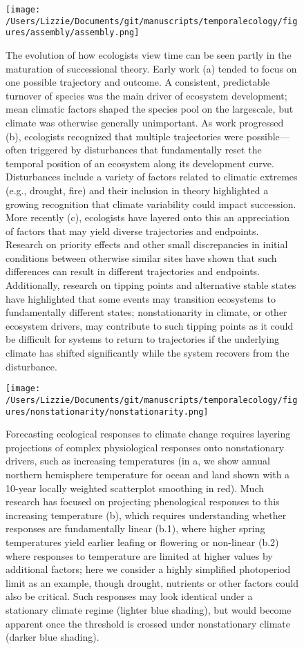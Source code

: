 \documentclass[11pt,a4paper,oneside]{article}
\begin{document}
\newpage
\begin{figure}[h!]
\centering
\noindent \texttt{[image: /Users/Lizzie/Documents/git/manuscripts/temporalecology/figures/assembly/assembly.png]}
\caption{The evolution of how ecologists view time can be seen partly in the maturation of successional theory. Early work (a) tended to focus on one possible trajectory and outcome. A consistent, predictable turnover of species was the main driver of ecosystem development; mean climatic factors shaped the species pool on the largescale, but climate was otherwise generally unimportant. As work progressed (b), ecologists recognized that multiple trajectories were possible---often triggered by disturbances that fundamentally reset the temporal position of an ecosystem along its development curve. Disturbances include a variety of factors related to climatic extremes (e.g., drought, fire) and their inclusion in theory highlighted a growing recognition that climate variability could impact succession. More recently (c), ecologists have layered onto this an appreciation of factors that may yield diverse trajectories and endpoints. Research on priority effects and other small discrepancies in initial conditions between otherwise similar sites have shown that such differences can result in different trajectories and endpoints. Additionally, research on tipping points and alternative stable states have highlighted that some events may transition ecosystems to fundamentally different states; nonstationarity in climate, or other ecosystem drivers, may contribute to such tipping points as it could be difficult for systems to return to trajectories if the underlying climate has shifted significantly while the system recovers from the disturbance.}
\end{figure}

\newpage
\begin{figure}[h!]
\centering
\noindent \texttt{[image: /Users/Lizzie/Documents/git/manuscripts/temporalecology/figures/nonstationarity/nonstationarity.png]}
\caption{Forecasting ecological responses to climate change requires layering projections of complex physiological responses onto nonstationary drivers, such as increasing temperatures (in a, we show annual northern hemisphere temperature for ocean and land shown with a 10-year locally weighted scatterplot smoothing in red). Much research has focused on projecting phenological responses to this increasing temperature (b), which requires understanding whether responses are fundamentally linear (b.1), where higher spring temperatures yield earlier leafing or flowering or non-linear (b.2) where responses to temperature are limited at higher values by additional factors; here we consider a highly simplified photoperiod limit as an example, though drought, nutrients or other factors could also be critical. Such responses may look identical under a stationary climate regime (lighter blue shading), but would become apparent once the threshold is crossed under nonstationary climate (darker blue shading).}
\end{figure}
\end{document}
